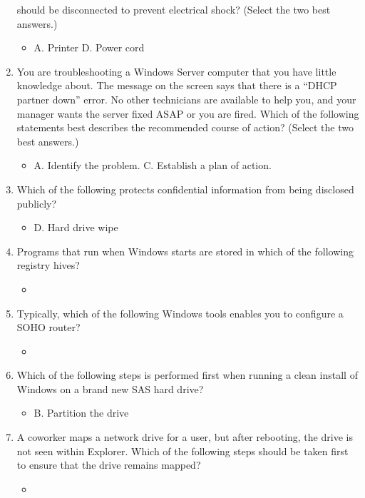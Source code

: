\documentclass{article}
\begin{document}
\begin{enumerate}
should be disconnected to prevent electrical shock? (Select the
two best answers.)
    \begin{itemize}
        \item A. Printer D. Power cord
    \end{itemize}
    \item You are troubleshooting a Windows Server computer that you have
little knowledge about. The message on the screen says that there
is a “DHCP partner down” error. No other technicians are available
to help you, and your manager wants the server fixed ASAP or you
are fired. Which of the following statements best describes the
recommended course of action? (Select the two best answers.)
    \begin{itemize}
        \item A. Identify the problem. C. Establish a plan of action.
    \end{itemize}
    \item Which of the following protects confidential information from
being disclosed publicly?
    \begin{itemize}
        \item D. Hard drive wipe
    \end{itemize}
    \item Programs that run when Windows starts are stored in which of the
following registry hives?
    \begin{itemize}
        \item 
    \end{itemize}
    \item Typically, which of the following Windows tools enables you to
configure a SOHO router?
    \begin{itemize}
        \item 
    \end{itemize}
    \item Which of the following steps is performed first when running a
clean install of Windows on a brand new SAS hard drive?
    \begin{itemize}
        \item B. Partition the drive
    \end{itemize}
    \item A coworker maps a network drive for a user, but after rebooting,
the drive is not seen within Explorer. Which of the following steps
should be taken first to ensure that the drive remains mapped?
    \begin{itemize}
        \item 

\end{itemize}
\end{enumerate}
\end{document}
